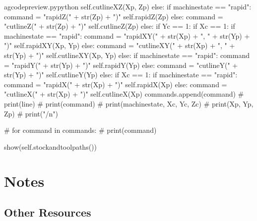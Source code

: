 \documentclass{ltxdoc}
\begin{document}
\begin{writecode}{a}{gcodepreview.py}{python}
                                self.cutlineXZ(Xp, Zp)
                        else:
                            if machinestate == "rapid":
                                command = "rapidZ(" + str(Zp) + ")"
                                self.rapidZ(Zp)
                            else: 
                                command = "cutlineZ(" + str(Zp) + ")"
                                self.cutlineZ(Zp)
                else:
                    if Yc == 1:
                        if Xc == 1:
                            if machinestate == "rapid":
                                command = "rapidXY(" + str(Xp) + ", " + str(Yp) + ")"
                                self.rapidXY(Xp, Yp)
                            else: 
                                command = "cutlineXY(" + str(Xp) + ", " + str(Yp) + ")"
                                self.cutlineXY(Xp, Yp)
                        else:
                            if machinestate == "rapid":
                                command = "rapidY(" + str(Yp) + ")"
                                self.rapidY(Yp)
                            else: 
                                command = "cutlineY(" + str(Yp) + ")"
                                self.cutlineY(Yp)
                    else:
                        if Xc == 1:
                            if machinestate == "rapid":
                                command = "rapidX(" + str(Xp) + ")"
                                self.rapidX(Xp)
                            else: 
                                command = "cutlineX(" + str(Xp) + ")"
                                self.cutlineX(Xp)
                commands.append(command)
#                print(line)
#                print(command)
#                print(machinestate, Xc, Yc, Zc)
#                print(Xp, Yp, Zp)
#                print("/n")

#        for command in commands:
#            print(command)

        show(self.stockandtoolpaths())

\end{writecode}
\addtocounter{gcpy}{179}



\section{Notes}

\subsection{Other Resources}
\end{document}
